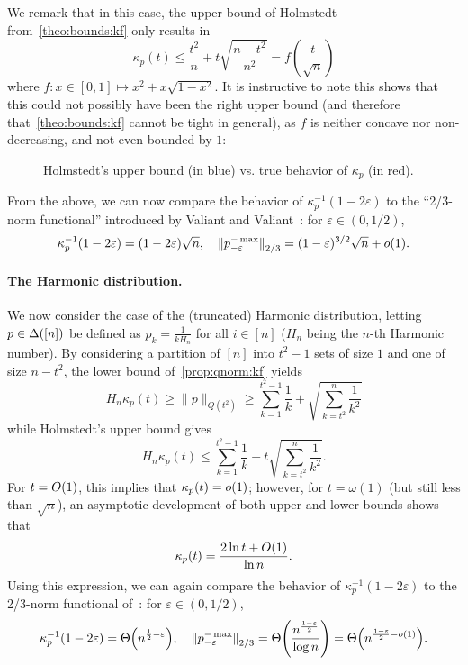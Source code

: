 \documentclass[11pt]{article}
\theoremstyle{remark}   	\newtheorem{remark}[theorem]{Remark}
\theoremstyle{definition}   	\newaliascnt{defn}{theorem}
\newcommand{\eps}{\ensuremath{\varepsilon}\xspace}
\newcommand{\littleO}[1]{{o\mleft( #1 \mright)}}
\newcommand{\bigO}[1]{{O\mleft( #1 \mright)}}
\newcommand{\bigTheta}[1]{{\Theta\mleft( #1 \mright)}}
\newcommand{\norm}[1]{\lVert#1{\rVert}}
\newcommand{\kf}[1]{\kappa_{#1}}
\begin{document}
We remark that in this case, the upper bound of Holmstedt from~\autoref{theo:bounds:kf} only results in
\[
    \kf{p}(t) \leq  \frac{t^2}{n} + t\sqrt{\frac{n-t^2}{n^2}}  = f\left(\frac{t}{\sqrt{n}}\right)
\]
where $f\colon x\in [0,1]\mapsto x^2+x\sqrt{1-x^2}$. It is instructive to note this shows that this could not possibly have been the right upper bound (and therefore that~\autoref{theo:bounds:kf} cannot be tight in general), as $f$ is neither concave nor non-decreasing, and not even bounded by $1$:
\begin{figure}[H]\centering
  \caption{Holmstedt's upper bound (in blue) vs. true behavior of $\kf{p}$ (in red).}
\end{figure}

From the above, we can now compare the behavior of $\kf{p}^{-1}(1-2\eps)$ to the ``2/3-norm functional'' introduced by Valiant and Valiant~\cite{VV:14}: for $\eps\in(0,1/2)$,
\begin{equation}\label{eq:comparison:vv:1}
    \kf{p}^{-1}(1-2\eps) = (1-2\eps)\sqrt{n}, \quad \norm{p^{-\max}_{-\eps}}_{2/3} = (1-\eps)^{3/2} \sqrt{n} + \littleO{1}.
\end{equation}

\paragraph{The Harmonic distribution.} We now consider the case of the (truncated) Harmonic distribution, letting $p\in\Delta\!\left([n]\right)$ be defined as $p_k = \frac{1}{k H_n}$ for all $i\in[n]$ ($H_n$ being the $n$-th Harmonic number). By considering a partition of $[n]$ into $t^2-1$ sets of size $1$ and one of size $n-t^2$, the lower bound of~\autoref{prop:qnorm:kf} yields
\[
H_n \kf{p}(t) \geq \norm{p}_{Q(t^2)} \geq \sum_{k=1}^{t^2-1} \frac{1}{k} + \sqrt{\sum_{k=t^2}^n \frac{1}{k^2}}
\]
while Holmstedt's upper bound gives
\[
H_n \kf{p}(t) \leq \sum_{k=1}^{t^2-1} \frac{1}{k} + t\sqrt{\sum_{k=t^2}^n \frac{1}{k^2}}.
\]
For $t = \bigO{1}$, this implies that $\kf{p}(t) = \littleO{1}$; however, for $t = \omega(1)$ (but still less than $\sqrt{n}$), an asymptotic development of both upper and lower bounds shows that
\[
    \kf{p}(t) = \frac{2\ln t + \bigO{1}}{\ln n}.
\]
Using this expression, we can again compare the behavior of $\kf{p}^{-1}(1-2\eps)$ to the 2/3-norm functional of~\cite{VV:14}: for $\eps\in(0,1/2)$,
\begin{equation}\label{eq:comparison:vv:2}
    \kf{p}^{-1}(1-2\eps) = \bigTheta{n^{\frac{1}{2}-\eps}}, \quad \norm{p^{-\max}_{-\eps}}_{2/3} = \bigTheta{\frac{n^{\frac{1-\eps}{2}}}{\log n}} = \bigTheta{n^{\frac{1-\eps}{2}-o(1)}}.
\end{equation}
 
\end{document}
